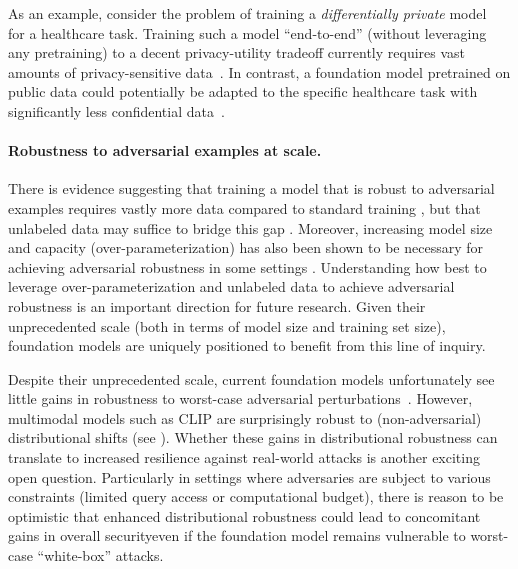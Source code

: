 As an example, consider the problem of training a \emph{differentially private} model~\citep{dwork2006calibrating} for a healthcare task. Training such a model ``end-to-end'' (\ie without leveraging any pretraining) to a decent privacy-utility tradeoff currently requires vast amounts of privacy-sensitive data~\citep{mcmahan2017learning, basu2021benchmarking}. In contrast, a foundation model pretrained on public data could potentially be adapted to the specific healthcare task 
with significantly less confidential data~\citep{bommasani19towards, tramer2021dp}.

\paragraph{Robustness to adversarial examples at scale.}
There is evidence suggesting that training a model that is robust to adversarial examples requires vastly more data compared to standard training \citep{schmidt2018adversarially}, but that unlabeled data may suffice to bridge this gap \citep{carmon2019unlabeled,uesato2019are}.
Moreover, increasing model size and capacity (\ie over-parameterization) has also been shown to be necessary for achieving adversarial robustness in some settings \citep{madry2018towards,bubeck2021universal}.
Understanding how best to leverage over-parameterization and unlabeled data to achieve adversarial robustness is an important direction for future research. Given their unprecedented scale (both in terms of model size and training set size),
foundation models are uniquely positioned to benefit from this line of inquiry.

Despite their unprecedented scale, current foundation models unfortunately see little gains in robustness to worst-case adversarial perturbations~\citep{Fort2021CLIPadversarial, wallace2019universal}. However, multimodal models such as CLIP are surprisingly robust to (non-adversarial) distributional shifts (see ).
Whether these gains in distributional robustness can translate to increased resilience 
against real-world attacks is another exciting open question.
Particularly in settings where adversaries are subject to various constraints (\eg limited query access or computational budget), there is reason to be optimistic that enhanced distributional robustness could lead to concomitant gains in overall security\dash{}even if the foundation model remains vulnerable to worst-case ``white-box'' attacks. 
